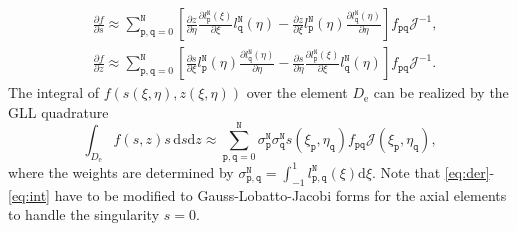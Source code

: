 \documentclass[extra,referee]{gji}
\begin{document}
\begin{align}
 & \frac{\partial f}{\partial s} \approx 
 \sum_{\mathtt{p},\mathtt{q}=0}^{\mathtt{N}}
 \!\left[\frac{\partial z}{\partial \eta} 
 \frac{\partial l_{\mathtt{p}}^{\mathtt{N}}\left(\xi\right)}{\partial \xi}
 l_{\mathtt{q}}^{\mathtt{N}}\left(\eta\right)-  
 \frac{\partial z}{\partial \xi} 
 l_{\mathtt{p}}^{\mathtt{N}}\left(\eta\right)
 \frac{\partial l_{\mathtt{q}}^{\mathtt{N}}\left(\eta\right)}{\partial \eta}
 \right]\!f_{\mathtt{p}\mathtt{q}}\mathcal{J}^{-1},\label{eq:der}\\[.5em]
 & \frac{\partial f}{\partial z} \approx 
 \sum_{\mathtt{p},\mathtt{q}=0}^{\mathtt{N}}
 \!\left[\frac{\partial s}{\partial \xi} 
 l_{\mathtt{p}}^{\mathtt{N}}\left(\eta\right)
 \frac{\partial l_{\mathtt{q}}^{\mathtt{N}}\left(\eta\right)}{\partial \eta}
 -\frac{\partial s}{\partial \eta} 
 \frac{\partial l_{\mathtt{p}}^{\mathtt{N}}\left(\xi\right)}{\partial \xi}
 l_{\mathtt{q}}^{\mathtt{N}}\left(\eta\right)
 \right]\!f_{\mathtt{p}\mathtt{q}}\mathcal{J}^{-1}.\label{eq:der2}
\end{align}
The integral of $f\left(s\left(\xi,\eta\right),z\left(\xi,\eta\right)\right)$ over the element 
$D_\text{e}$ can be realized by the GLL quadrature
\begin{equation}
  \int_{D_\text{e}}f\left(s,z\right)s\,\text{d}s\text{d}z\approx 
  \sum_{\mathtt{p},\mathtt{q}=0}^{\mathtt{N}}
  \sigma_{\mathtt{p}}^{\mathtt{N}} \sigma_{\mathtt{q}}^{\mathtt{N}}
  s\left(\xi_\mathtt{p},\eta_\mathtt{q}\right) f_{\mathtt{p}\mathtt{q}}
  \mathcal{J}\left(\xi_\mathtt{p},\eta_\mathtt{q}\right),
  \label{eq:int}
\end{equation} 
where the weights are determined by 
$\sigma_{\mathtt{p,q}}^{\mathtt{N}}=
\int_{-1}^1 l_{\mathtt{p,q}}^{\mathtt{N}}\left(\xi\right)\text{d}\xi$.  
Note that \eqref{eq:der}-\eqref{eq:int} have to be modified to 
Gauss-Lobatto-Jacobi forms for the axial 
elements \cite[]{nissen2007sem} to handle the singularity $s=0$.
\end{document}
